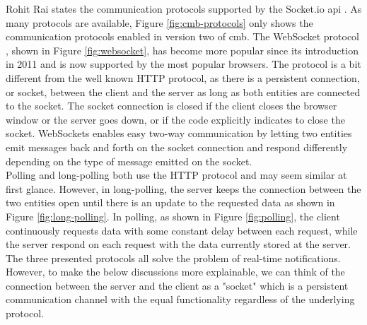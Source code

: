 Rohit Rai states the communication protocols supported by the Socket.io \gls{api} \cite{Rai2013}. As many protocols are available, Figure \ref{fig:cmb-protocols} only shows the communication protocols enabled in version two of \gls{cmb}. The WebSocket protocol \cite{a:Fette2011}, shown in Figure \ref{fig:websocket}, has become more popular since its introduction in 2011 and is now supported by the most popular browsers. The protocol is a bit different from the well known HTTP protocol, as there is a persistent connection, or socket, between the client and the server as long as both entities are connected to the socket. The socket connection is closed if the client closes the browser window or the server goes down, or if the code explicitly indicates to close the socket. WebSockets enables easy two-way communication by letting two entities emit messages back and forth on the socket connection and respond differently depending on the type of message emitted on the socket. \\

Polling and long-polling both use the HTTP protocol and may seem similar at first glance. However, in long-polling, the server keeps the connection between the two entities open until there is an update to the requested data as shown in Figure \ref{fig:long-polling}. In polling, as shown in Figure \ref{fig:polling}, the client continuously requests data with some constant delay between each request, while the server respond on each request with the data currently stored at the server. The three presented protocols all solve the problem of real-time notifications. However, to make the below discussions more explainable, we can think of the connection between the server and the client as a "socket" which is a persistent communication channel with the equal functionality regardless of the underlying protocol. \\

